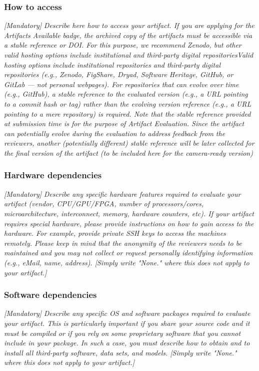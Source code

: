 \subsubsection{How to access}
{\em [Mandatory]} \textit{Describe here how to access your artifact. If you are
applying for the Artifacts Available badge, the archived copy of the artifacts
must be accessible via a stable reference or DOI. For this purpose, we recommend
Zenodo, but other valid hosting options include institutional and third-party
digital repositoriesValid hosting options include institutional repositories and
third-party digital repositories (e.g., Zenodo, FigShare, Dryad, Software
Heritage, GitHub, or GitLab — not personal webpages). For repositories that can
evolve over time (e.g., GitHub), a stable reference to the evaluated version
(e.g., a URL pointing to a commit hash or tag) rather than the evolving version
reference (e.g., a URL pointing to a mere repository) is required. Note that the
stable reference provided at submission time is for the purpose of Artifact
Evaluation. Since the artifact can potentially evolve during the evaluation to
address feedback from the reviewers, another (potentially different) stable
reference will be later collected for the final version of the artifact (to be
included here for the camera-ready version)}


\subsubsection{Hardware dependencies}
{\em [Mandatory]} \textit{Describe any specific hardware features required to
evaluate your artifact (vendor, CPU/GPU/FPGA, number of processors/cores,
microarchitecture, interconnect, memory, hardware counters, etc). If your
artifact requires special hardware, please provide instructions on how to gain
access to the hardware. For example, provide private SSH keys to access the
machines remotely. Please keep in mind that the anonymity of the reviewers needs
to be maintained and you may not collect or request personally identifying
information (e.g., eMail, name, address). [Simply write "None." where this does
not apply to your artifact.]}

\subsubsection{Software dependencies}
{\em [Mandatory]} \textit{Describe any specific OS and software packages
required to evaluate your artifact. This is particularly important if you share
your source code and it must be compiled or if you rely on some proprietary
software that you cannot include in your package. In such a case, you must
describe how to obtain and to install all third-party software, data sets, and
models. [Simply write "None." where this does not apply to your artifact.]}

